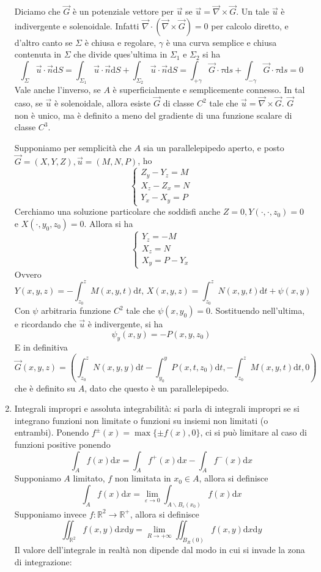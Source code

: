 \documentclass[a4paper,11pt]{article}
\begin{document}
\begin{enumerate}
	Diciamo che $\vec{G}$ è un potenziale vettore per $\vec{u}$ se $\vec{u}=\vec{\nabla}\times\vec{G}$. Un tale $\vec{u}$ è indivergente e solenoidale. Infatti $\vec{\nabla}\cdot(\vec{\nabla}\times\vec{G})=0$ per calcolo diretto, e d'altro canto se $\Sigma$ è chiusa e regolare, $\gamma$ è una curva semplice e chiusa contenuta in $\Sigma$ che divide ques'ultima in $\Sigma_1$ e $\Sigma_2$ si ha
	\[\int_{\Sigma}\vec{u}\cdot\vec{n}\mathrm{d}S=\int_{\Sigma_1}\vec{u}\cdot\vec{n}\mathrm{d}S+\int_{\Sigma_2}\vec{u}\cdot\vec{n}\mathrm{d}S=\int_{+\gamma}\vec{G}\cdot\tau\mathrm{d}s+\int_{-\gamma}\vec{G}\cdot\tau\mathrm{d}s=0\]
	Vale anche l'inverso, se $A$ è superficialmente e semplicemente connesso. In tal caso, se $\vec{u}$ è solenoidale, allora esiste $\vec{G}$ di classe $C^2$ tale che $\vec{u}=\vec{\nabla}\times\vec{G}$. $\vec{G}$ non è unico, ma è definito a meno del gradiente di una funzione scalare di classe $C^3$.
	
	Supponiamo per semplicità che $A$ sia un parallelepipedo aperto, e posto $\vec{G}=(X,Y,Z),\vec{u}=(M,N,P)$, ho
	\[\left\{\begin{array}{l}
	Z_y-Y_z=M \\
	X_z-Z_x=N \\
	Y_x-X_y=P
	\end{array}\right.\]
	Cerchiamo una soluzione particolare che soddisfi anche $Z=0, Y(\cdot,\cdot,z_0)=0$ e $X(\cdot,y_0,z_0)=0$. Allora si ha
	\[\left\{\begin{array}{l}
	Y_z=-M \\
	X_z=N\\
	X_y=P-Y_x
	\end{array}\right.\]
	Ovvero
	\[Y(x,y,z)=-\int_{z_0}^{z}M(x,y,t)\mathrm{d}t\textrm{,  }X(x,y,z)=\int_{z_0}^{z}N(x,y,t)\mathrm{d}t+\psi(x,y)\]
	Con $\psi$ arbitraria funzione $C^2$ tale che $\psi(x,y_0)=0$. Sostituendo nell'ultima, e ricordando che $\vec{u}$ è indivergente, si ha
	\[\psi_y(x,y)=-P(x,y,z_0)\]
	E in definitiva
	\[\vec{G}(x,y,z)=\left(\int_{z_0}^{z}N(x,y,y)\mathrm{d}t-\int_{y_0}^{y}P(x,t,z_0)\mathrm{d}t,-\int_{z_0}^{z}M(x,y,t)\mathrm{d}t,0\right)\]
	che è definito su $A$, dato che questo è un parallelepipedo.
	\item Integrali impropri e assoluta integrabilità: si parla di integrali impropri se si integrano funzioni non limitate o funzioni su insiemi non limitati (o entrambi). Ponendo $f^{\pm}(x)=\max\{\pm f(x),0\}$, ci si può limitare al caso di funzioni positive ponendo
	\[\int_Af(x)\mathrm{d}x=\int_Af^+(x)\mathrm{d}x-\int_Af^-(x)\mathrm{d}x\]
	Supponiamo $A$ limitato, $f$ non limitata in $x_0\in A$, allora si definisce
	\[\int_Af(x)\mathrm{d}x=\lim\limits_{\varepsilon\to0}\int_{A\backslash B_\varepsilon(x_0)}f(x)\mathrm{d}x\]
	Supponiamo invece $f\colon\mathbb{R}^2\to\mathbb{R}^+$, allora si definisce
	\[\iint_{\mathbb{R}^2}f(x,y)\mathrm{d}x\mathrm{d}y=\lim\limits_{R\to+\infty}\iint_{B_R(0)}f(x,y)\mathrm{d}x\mathrm{d}y\]
	Il valore dell'integrale in realtà non dipende dal modo in cui si invade la zona di integrazione:
	

\end{enumerate}
\end{document}
